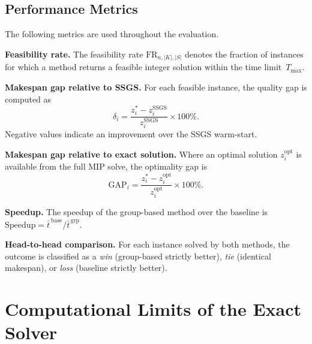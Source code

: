 \subsection{Performance Metrics}
\label{subsec:metrics}


The following metrics are used throughout the evaluation.

\textbf{Feasibility rate.}
The feasibility rate $\mathrm{FR}_{n,|K|,|S|}$ denotes the
fraction of instances for which a method returns a feasible
integer solution within the time limit~$T_{\max}$.

\textbf{Makespan gap relative to SSGS.}
For each feasible instance, the quality gap is computed as
\begin{equation}
  \delta_i
  = \frac{z^*_i - z^{\mathrm{SSGS}}_i}{z^{\mathrm{SSGS}}_i}
    \times 100\%.
  \label{eq:gap_ssgs}
\end{equation}
Negative values indicate an improvement over the SSGS
warm-start.

\textbf{Makespan gap relative to exact solution.}
Where an optimal solution $z^{\mathrm{opt}}_i$ is available
from the full MIP solve, the optimality gap is
\begin{equation}
  \mathrm{GAP}_i
  = \frac{z^*_i - z^{\mathrm{opt}}_i}{z^{\mathrm{opt}}_i}
    \times 100\%.
  \label{eq:gap_opt}
\end{equation}

\textbf{Speedup.}
The speedup of the group-based method over the baseline is
$\mathrm{Speedup} = \bar{t}^{\,\mathrm{base}} /
\bar{t}^{\,\mathrm{grp}}$.

\textbf{Head-to-head comparison.}
For each instance solved by both methods, the outcome is
classified as a \emph{win} (group-based strictly better),
\emph{tie} (identical makespan), or \emph{loss} (baseline
strictly better).


\section{Computational Limits of the Exact Solver}
\label{sec:exact_limits}



